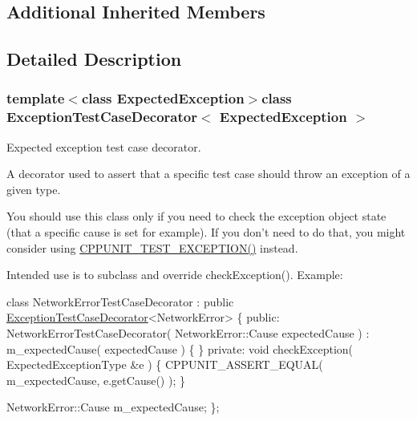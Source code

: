 \subsection*{Additional Inherited Members}


\subsection{Detailed Description}
\subsubsection*{template$<$class Expected\-Exception$>$class Exception\-Test\-Case\-Decorator$<$ Expected\-Exception $>$}

Expected exception test case decorator. 

A decorator used to assert that a specific test case should throw an exception of a given type.

You should use this class only if you need to check the exception object state (that a specific cause is set for example). If you don't need to do that, you might consider using \hyperlink{group___writing_test_fixture_gaca8eeb6f60714baade6cbfd185868c40}{C\-P\-P\-U\-N\-I\-T\-\_\-\-T\-E\-S\-T\-\_\-\-E\-X\-C\-E\-P\-T\-I\-O\-N()} instead.

Intended use is to subclass and override check\-Exception(). Example\-:


\begin{DoxyCode}
\textcolor{keyword}{class }NetworkErrorTestCaseDecorator : 
          \textcolor{keyword}{public} \hyperlink{class_exception_test_case_decorator}{ExceptionTestCaseDecorator}<NetworkError>
\{
\textcolor{keyword}{public}:
  NetworkErrorTestCaseDecorator( NetworkError::Cause expectedCause )
      : m\_expectedCause( expectedCause )
  \{
  \}
\textcolor{keyword}{private}:
  \textcolor{keywordtype}{void} checkException( ExpectedExceptionType &e )
  \{
    CPPUNIT\_ASSERT\_EQUAL( m\_expectedCause, e.getCause() );
  \}

  NetworkError::Cause m\_expectedCause;
\};
\end{DoxyCode}
 

